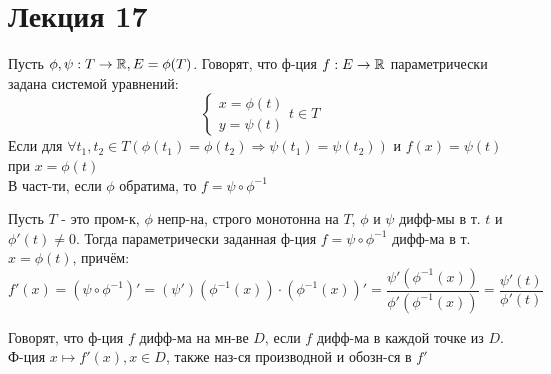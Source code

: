 \section{Лекция 17}

\begin{definition}
Пусть $\phi, \psi: T \rightarrow \mathbb{R}, E = \phi(T)$. Говорят, что ф-ция $f: E \rightarrow \mathbb{R}$ параметрически задана системой уравнений:
\[
\begin{cases}
x = \phi(t) \\
y = \psi(t)
\end{cases} t \in T
\]
Если для $\forall t_1, t_2 \in T \left(\phi(t_1) = \phi(t_2) \Rightarrow \psi(t_1) = \psi(t_2)\right)$ и $f(x) = \psi(t)$ при $x = \phi(t)$ \\
В част-ти, если $\phi$ обратима, то $f = \psi \circ \phi^{-1}$
\end{definition}
\begin{consequence}
  Пусть $T$ - это пром-к, $\phi$ непр-на, строго монотонна на $T$, $\phi$ и $\psi$ дифф-мы в т. $t$ и $\phi'(t) \neq 0$. Тогда параметрически заданная ф-ция $f = \psi \circ \phi^{-1}$ дифф-ма в т. $x = \phi(t)$, причём: 
  \[
  f'(x) = (\psi \circ \phi^{-1})' = (\psi')(\phi^{-1}(x)) \cdot (\phi^{-1}(x))' = \frac{\psi'(\phi^{-1}(x))}{\phi'(\phi^{-1}(x))} = \frac{\psi'(t)}{\phi'(t)}
  \]
\end{consequence}
\begin{definition}
Говорят, что ф-ция $f$ дифф-ма на мн-ве $D$, если $f$ дифф-ма в каждой точке из $D$. \\
Ф-ция $x \mapsto f'(x), x \in D$, также наз-ся производной и обозн-ся в $f'$
\end{definition}

